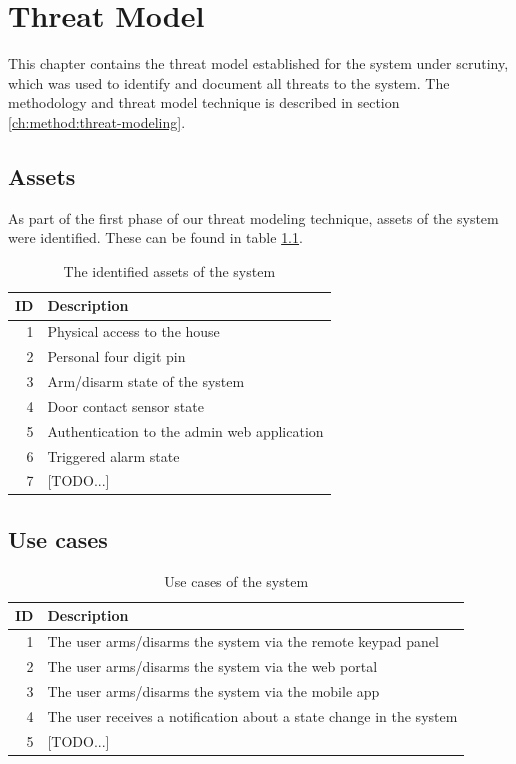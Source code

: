 \chapter{Threat Model} \label{ch:threat-model}
This chapter contains the threat model established for the system under scrutiny, which was used to identify and document all threats to the system. The methodology and threat model technique is described in section \ref{ch:method:threat-modeling}.

\section{Assets}
As part of the first phase of our threat modeling technique, assets of the system were identified. These can be found in table \ref{tb:assets}.
\begin{table}[!ht]
    \centering
    \begin{tabular}{r l}
        \hline
        \textbf{ID} & \textbf{Description} \\
        \hline
        1  & Physical access to the house \\
        2  & Personal four digit pin \\
        3  & Arm/disarm state of the system \\
        4  & Door contact sensor state \\
        5  & Authentication to the admin web application \\
        6  & Triggered alarm state \\
        7  & [TODO...] \\
        \hline
    \end{tabular}
    \caption{The identified assets of the system}
    \label{tb:assets}
\end{table}

\section{Use cases}
\begin{table}[!ht]
    \centering
    \begin{tabularx}{\textwidth}{r X}
        \textbf{ID} & \textbf{Description}  \\
        \hline
        1  & The user arms/disarms the system via the remote keypad panel \\
        2  & The user arms/disarms the system via the web portal \\
        3  & The user arms/disarms the system via the mobile app \\
        4  & The user receives a notification about a state change in the system \\
        5  & [TODO...] \\
        \hline
    \end{tabularx}
    \caption{Use cases of the system}
    \label{tb:use-cases}
\end{table}

